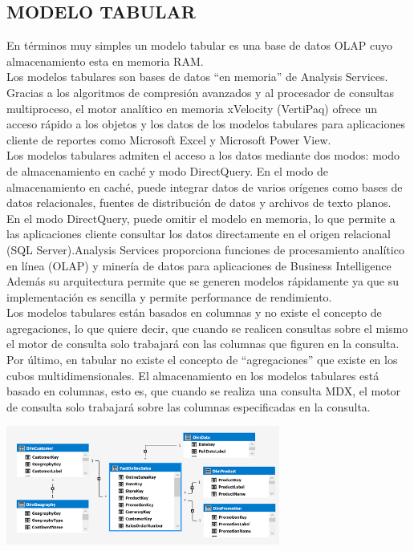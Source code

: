 \documentclass[%
 reprint,
 amsmath,amssymb,
 aps,
]{revtex4-1}
\begin{document}
\subsection{MODELO TABULAR}
En términos muy simples un modelo tabular es una base de datos OLAP cuyo almacenamiento esta en memoria RAM. \cite{damian1}\\
Los modelos tabulares son bases de datos “en memoria” de Analysis Services. Gracias a los algoritmos de compresión avanzados y al procesador de consultas multiproceso, el motor analítico en memoria xVelocity (VertiPaq) ofrece un acceso rápido a los objetos y los datos de los modelos tabulares para aplicaciones cliente de reportes como Microsoft Excel y Microsoft Power View.\\
Los modelos tabulares admiten el acceso a los datos mediante dos modos: modo de almacenamiento en caché y modo DirectQuery. En el modo de almacenamiento en caché, puede integrar datos de varios orígenes como bases de datos relacionales, fuentes de distribución de datos y archivos de texto planos. \\
En el modo DirectQuery, puede omitir el modelo en memoria, lo que permite a las aplicaciones cliente consultar los datos directamente en el origen relacional (SQL Server).Analysis Services proporciona funciones de procesamiento analítico en línea (OLAP) y minería de datos para aplicaciones de Business Intelligence
Además su arquitectura permite que se generen modelos rápidamente ya que su implementación es sencilla y permite performance de rendimiento.\\
Los modelos tabulares están basados en columnas y no existe el concepto de agregaciones, lo que quiere decir, que cuando se realicen consultas sobre el mismo el motor de consulta solo trabajará con las columnas que figuren en la consulta.\\
Por último, en tabular no existe el concepto de “agregaciones” que existe en los cubos multidimensionales. El almacenamiento en los modelos tabulares está basado en columnas, esto es, que cuando se realiza una consulta MDX, el motor de consulta solo trabajará sobre las columnas especificadas en la consulta. \cite{damian2}
\begin{center}
	\includegraphics[width=9cm]{./Imagenes/modelotabular}
\end{center}
\newpage
\end{document}
